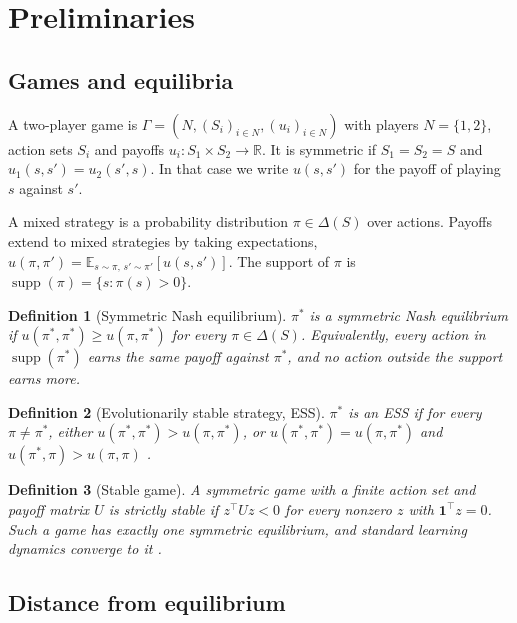 \documentclass{article}
\newtheorem{definition}{Definition}
\newcommand{\R}{\mathbb{R}}
\newcommand{\E}{\mathbb{E}}
\begin{document}
\section{Preliminaries}
\label{sec:prelim}

\subsection{Games and equilibria}

A two-player game is $\Gamma = (N, (S_i)_{i\in N}, (u_i)_{i \in N})$ with players $N = \{1,2\}$, action sets $S_i$ and payoffs $u_i : S_1 \times S_2 \to \R$. It is symmetric if $S_1 = S_2 = S$ and $u_1(s,s') = u_2(s',s)$. In that case we write $u(s,s')$ for the payoff of playing $s$ against $s'$.

A mixed strategy is a probability distribution $\pi \in \Delta(S)$ over actions. Payoffs extend to mixed strategies by taking expectations, $u(\pi,\pi') = \E_{s \sim \pi,\, s' \sim \pi'}[u(s,s')]$. The support of $\pi$ is $\operatorname{supp}(\pi) = \{s : \pi(s) > 0\}$.

\begin{definition}[Symmetric Nash equilibrium]
$\pi^*$ is a symmetric Nash equilibrium if $u(\pi^*,\pi^*) \ge u(\pi,\pi^*)$ for every $\pi \in \Delta(S)$. Equivalently, every action in $\operatorname{supp}(\pi^*)$ earns the same payoff against $\pi^*$, and no action outside the support earns more.
\end{definition}

\begin{definition}[Evolutionarily stable strategy, ESS]
$\pi^*$ is an ESS if for every $\pi \ne \pi^*$, either $u(\pi^*,\pi^*) > u(\pi,\pi^*)$, or $u(\pi^*,\pi^*) = u(\pi,\pi^*)$ and $u(\pi^*,\pi) > u(\pi,\pi)$ \citep{maynardsmith1974}.
\end{definition}

\begin{definition}[Stable game]
A symmetric game with a finite action set and payoff matrix $U$ is strictly stable if $z^\top U z < 0$ for every nonzero $z$ with $\mathbf 1^\top z = 0$. Such a game has exactly one symmetric equilibrium, and standard learning dynamics converge to it \citep{hofbauer2009}.
\end{definition}

\subsection{Distance from equilibrium}
\end{document}
